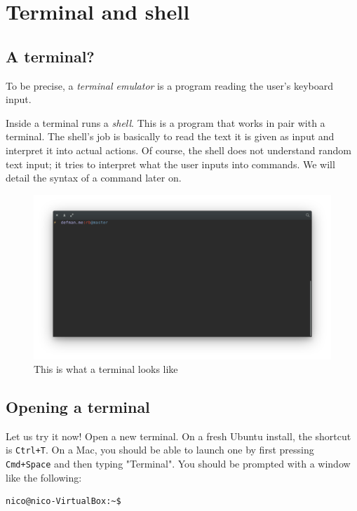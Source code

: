 \documentclass[12pt]{article}
\begin{document}
\section{Terminal and shell}

\subsection{A terminal?}

To be precise, a \textit{terminal emulator} is a program reading the user's keyboard input.

Inside a terminal runs a \textit{shell}. This is a program that works in pair with a terminal. The shell's job is basically to read the text it is given as input and interpret it into actual actions.
Of course, the shell does not understand random text input; it tries to interpret what the user inputs into commands.
We will detail the syntax of a command later on.

\begin{figure}[!h]\centering\captionsetup{}
   \includegraphics[scale = 0.20]{resources/terminal.png}
   \caption{This is what a terminal looks like}
\end{figure}

\subsection{Opening a terminal}

Let us try it now! Open a new terminal. On a fresh Ubuntu install, the shortcut is \texttt{Ctrl+T}. On a Mac, you should be able to launch one by first pressing \texttt{Cmd+Space} and then typing "Terminal".
You should be prompted with a window like the following:

\begin{lstlisting}[language=bash]
nico@nico-VirtualBox:~$
\end{lstlisting}
\end{document}

